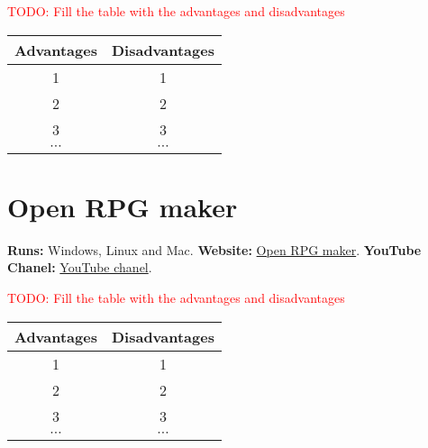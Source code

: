 \documentclass{article}
\begin{document}
\textcolor{red}{TODO: Fill the table with the advantages and disadvantages} 

\begin{center}
\begin{tabular}{ |c|c| } 
  \hline
  Advantages & Disadvantages\\ 
  \hline
  1 & 1\\ 
  \hline
  2 & 2\\
  \hline
  3 & 3\\
  \hline
  $\cdots$ & $\cdots$\\
  \hline
\end{tabular}
\end{center}

\section{Open RPG maker}

\textbf{Runs:} Windows, Linux and Mac.
\textbf{Website:} \href{https://openrpgmaker.sourceforge.net}{Open RPG maker}.
\textbf{YouTube Chanel:} \href{https://www.youtube.com/@openrpgmaker8158}{YouTube chanel}.

\textcolor{red}{TODO: Fill the table with the advantages and disadvantages} 

\begin{center}
\begin{tabular}{ |c|c| } 
  \hline
  Advantages & Disadvantages\\ 
  \hline
  1 & 1\\ 
  \hline
  2 & 2\\
  \hline
  3 & 3\\
  \hline
  $\cdots$ & $\cdots$\\
  \hline
\end{tabular}
\end{center}
\end{document}
